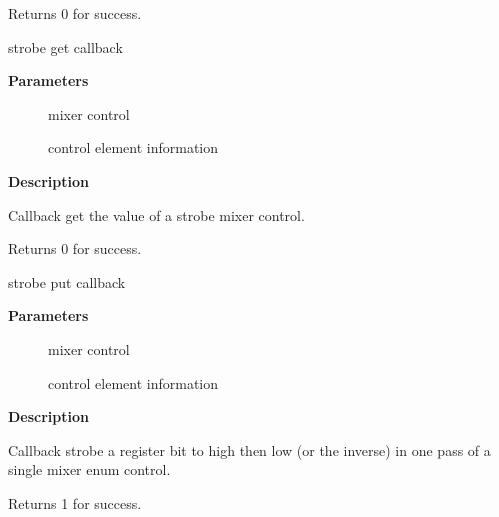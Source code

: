 \documentclass[a4paper,8pt,english]{sphinxmanual}
\begin{document}
Returns 0 for success.

\begin{fulllineitems}
\label{sound/kernel-api/alsa-driver-api:c.snd_soc_get_strobe}
strobe get callback

\end{fulllineitems}


\textbf{Parameters}
\begin{description}
\item[{}] \leavevmode
mixer control

\item[{}] \leavevmode
control element information

\end{description}

\textbf{Description}

Callback get the value of a strobe mixer control.

Returns 0 for success.

\begin{fulllineitems}
\label{sound/kernel-api/alsa-driver-api:c.snd_soc_put_strobe}
strobe put callback

\end{fulllineitems}


\textbf{Parameters}
\begin{description}
\item[{}] \leavevmode
mixer control

\item[{}] \leavevmode
control element information

\end{description}

\textbf{Description}

Callback strobe a register bit to high then low (or the inverse)
in one pass of a single mixer enum control.

Returns 1 for success.
\end{document}
